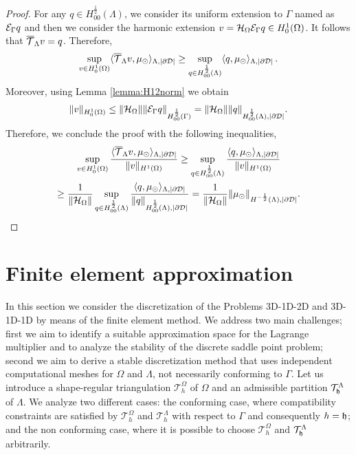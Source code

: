 \documentclass[r]{siamart171218}
\begin{document}
\begin{proof}
For any $q \in H^{\frac 12}_{00}(\Lambda)$, we consider its uniform extension to $\Gamma$ named as $\mathcal{E}_\Gamma q$
and then we consider the harmonic extension $v=\mathcal{H}_\Omega \mathcal{E}_\Gamma q\in H^1_0(\Omega)$. It follows that ${\overline{\mathcal{T}}_\Lambda} v=q$. Therefore, 
\begin{equation*}
\sup _{v\in H^1_0(\Omega)}  \langle {\overline{\mathcal{T}}_\Lambda} v, \mu_{\odot} \rangle_{\Lambda,|\partial\mathcal{D}|} \geq\sup_{q \in H^{\frac 12}_{00}(\Lambda)} \langle q, \mu_{\odot}  \rangle_{\Lambda,|\partial\mathcal{D}|}\,.
\end{equation*}
Moreover, using Lemma \ref{lemma:H12norm} we obtain
\begin{equation*}
\|v\|_{H^1_0(\Omega)}\leq \|\mathcal{H}_\Omega\| \|\mathcal{E}_\Gamma q\|_{H^{\frac 12}_{00}(\Gamma)}  = \|\mathcal{H}_\Omega\| \|q\|_{H^{\frac 12}_{00}(\Lambda),|\partial\mathcal{D}|}.
\end{equation*}
 Therefore, we conclude the proof with the following inequalities,
\begin{multline*}
\sup _{v\in H^1_0(\Omega)} \frac{ \langle {\overline{\mathcal{T}}_\Lambda} v, \mu_{\odot} \rangle_{\Lambda,|\partial\mathcal{D}|}}{\|v\|_{H^1(\Omega)}}
\geq \sup _{q\in H^{\frac 12}_{00}(\Lambda)} \frac{ \langle q, \mu_{\odot} \rangle_{\Lambda,|\partial\mathcal{D}|}}{\|v\|_{H^1(\Omega)}}
\\
\geq \frac{1}{\|\mathcal{H}_\Omega\|} \sup _{q\in H^{\frac 12}_{00}(\Lambda)} \frac{ \langle q, \mu_{\odot} \rangle_{\Lambda,|\partial\mathcal{D}|}}{\|q\|_{H^{\frac 12}_{00}(\Lambda),|\partial\mathcal{D}|}} 
= \frac{1}{\|\mathcal{H}_\Omega\|} \|\mu_{\odot}\|_{H^{-\frac 12}(\Lambda),|\partial\mathcal{D}|}.
\end{multline*}
\end{proof}


\section{Finite element approximation}
In this section we consider the discretization of the Problems 3D-1D-2D and 3D-1D-1D by means of the finite element method. We address two main challenges; first we aim to identify a suitable approximation space for the Lagrange multiplier and to analyze the stability of the discrete saddle point problem; second we aim to derive a stable discretization method that uses independent computational meshes for $\Omega$ and $\Lambda$, not necessarily conforming to $\Gamma$. Let us introduce a shape-regular triangulation $\mathcal{T}^{\Omega}_h$ of $\Omega$ and an admissible partition $\mathcal{T}^{\Lambda}_{\mathfrak{h}}$ of $\Lambda$.
We analyze two different cases: the conforming case, where compatibility constraints are satisfied by $\mathcal{T}^{\Omega}_h$ and $\mathcal{T}^{\Lambda}_{h}$ with respect to $\Gamma$ and consequently $h=\mathfrak{h}$; and the non conforming case, where it is possible to choose $\mathcal{T}^{\Omega}_h$ and $\mathcal{T}^{\Lambda}_{\mathfrak{h}}$ arbitrarily.
\end{document}
